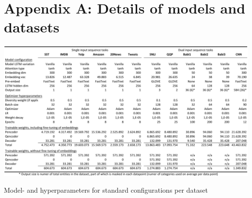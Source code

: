 \section*{Appendix A: Details of models and datasets}

\begin{table}[h]
\centering
\includegraphics[width=\textwidth]{./figures/hyperparams.pdf}
\caption{Model- and hyperparameters for standard configurations per dataset}
\label{fig:hyperparams}
\end{table}


